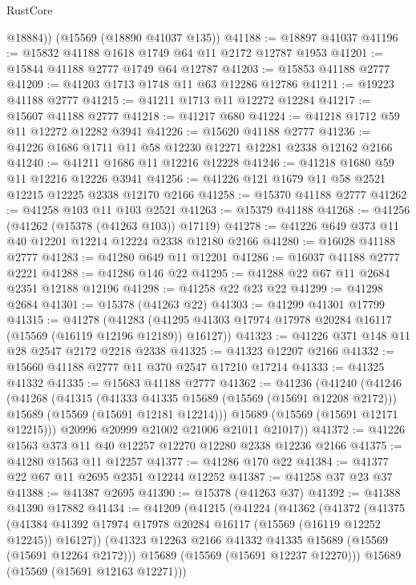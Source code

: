 \begin{lexlean}{RustCore}
\begin{coremodule}
        @18884))
    (@15569 (@18890 @41037 @135))
@41188 := @18897 @41037
@41196 := @15832 @41188 @1618 @1749 @64 @11 @2172 @12787 @1953
@41201 := @15844 @41188 @2777 @1749 @64 @12787
@41203 := @15853 @41188 @2777
@41209 := @41203 @1713 @1748 @11 @63 @12286 @12786
@41211 := @19223 @41188 @2777
@41215 := @41211 @1713 @11 @12272 @12284
@41217 := @15607 @41188 @2777
@41218 := @41217 @680
@41224 := @41218 @1712 @59 @11 @12272 @12282 @3941
@41226 := @15620 @41188 @2777
@41236 := @41226 @1686 @1711 @11 @58 @12230 @12271 @12281 @2338 @12162 @2166
@41240 := @41211 @1686 @11 @12216 @12228
@41246 := @41218 @1680 @59 @11 @12216 @12226 @3941
@41256 := @41226 @121 @1679 @11 @58 @2521 @12215 @12225 @2338 @12170 @2166
@41258 := @15370 @41188 @2777
@41262 := @41258 @103 @11 @103 @2521
@41263 := @15379 @41188
@41268 := @41256 (@41262 (@15378 (@41263 @103)) @17119)
@41278 := @41226 @649 @373 @11 @40 @12201 @12214 @12224 @2338 @12180 @2166
@41280 := @16028 @41188 @2777
@41283 := @41280 @649 @11 @12201
@41286 := @16037 @41188 @2777 @2221
@41288 := @41286 @146 @22
@41295 := @41288 @22 @67 @11 @2684 @2351 @12188 @12196
@41298 := @41258 @22 @23 @22
@41299 := @41298 @2684
@41301 := @15378 (@41263 @22)
@41303 := @41299 @41301 @17799
@41315 := @41278
    (@41283 (@41295 @41303 @17974 @17978 @20284 @16117 (@15569 (@16119 @12196 @12189)) @16127))
@41323 := @41226 @371 @148 @11 @28 @2547 @2172 @2218 @2338
@41325 := @41323 @12207 @2166
@41332 := @15660 @41188 @2777 @11 @370 @2547 @17210 @17214
@41333 := @41325 @41332
@41335 := @15683 @41188 @2777
@41362 := @41236
    (@41240
      (@41246
        (@41268
          (@41315
            (@41333 @41335 @15689 (@15569 (@15691 @12208 @2172)))
            @15689
            (@15569 (@15691 @12181 @12214)))
          @15689
          (@15569 (@15691 @12171 @12215)))
        @20996
        @20999
        @21002
        @21006
        @21011
        @21017))
@41372 := @41226 @1563 @373 @11 @40 @12257 @12270 @12280 @2338 @12236 @2166
@41375 := @41280 @1563 @11 @12257
@41377 := @41286 @170 @22
@41384 := @41377 @22 @67 @11 @2695 @2351 @12244 @12252
@41387 := @41258 @37 @23 @37
@41388 := @41387 @2695
@41390 := @15378 (@41263 @37)
@41392 := @41388 @41390 @17882
@41434 := @41209
    (@41215
      (@41224
        (@41362
          (@41372
            (@41375
              (@41384 @41392 @17974 @17978 @20284 @16117 (@15569 (@16119 @12252 @12245)) @16127))
            (@41323 @12263 @2166 @41332 @41335 @15689 (@15569 (@15691 @12264 @2172)))
            @15689
            (@15569 (@15691 @12237 @12270)))
          @15689
          (@15569 (@15691 @12163 @12271)))

\end{coremodule}
\end{lexlean}
